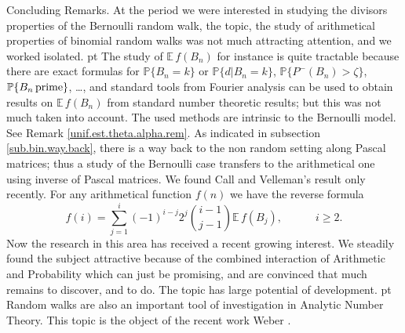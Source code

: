 \documentclass[11pt,draft,reqno]{amsart}
\makeatletter
\def\section{\@startsection{section}{1}%
     \z@{.7\linespacing\@plus\linespacing}{.5\linespacing}%
     {\bfseries%
     \centering
     }}
\theoremstyle{definition}
\theoremstyle{remarks}
\numberwithin{equation}{section}
\def \qq{{\qquad}}
\def\P{{\mathcal P}}
\def\E{{\mathbb E \,}}
\def\P{{\mathbb P}}
\makeatother
\begin{document}
 
 
 
 
 
 
 
 
 
 
 
 
 
 
 
 
 
  
  
  \section{Concluding Remarks.}\label{s10}
At the period we were interested in studying the divisors properties of the Bernoulli random walk, the topic, the study of arithmetical properties of binomial random walks was not much attracting attention, and we  worked   isolated.
 pt
The study of $\E f(B_n)$ for instance is quite tractable because there are exact formulas for $\P\{B_n=k\}$ or $\P\{d|B_n=k\}$,  $\P\{P^-(B_n)>\zeta \}$, $\P\{  B_n \,{\rm prime} \}$, \ldots, and standard tools from 
Fourier analysis    can be used to obtain results on $\E f(B_n)$ from standard number theoretic results; but this was not much taken into account. The used methods are intrinsic to the Bernoulli model. See   Remark \ref{unif.est.theta.alpha.rem}. %
As  indicated in subsection \ref{sub.bin.way.back}, there is a way back to the non random setting along Pascal matrices; 
thus a study of the Bernoulli case transfers to the  arithmetical one using inverse of Pascal matrices.  We found Call and Velleman's result only recently.
 For    any arithmetical function $f(n)$
 we have the reverse formula
 $$ f(i)=\sum_{j=1}^i  (-1)^{i-j}2^j{{i-1}\choose{j-1}}\E f(B_j),\qq\quad i\ge 2.
$$ 
Now the research in this area has received a recent growing interest.
We steadily found the subject attractive because of the combined interaction 
 of Arithmetic and Probability  which can just be promising, and are convinced  that much remains to discover, and to do. The topic has large potential of development.
 pt
Random walks are also an important tool of investigation  in Analytic  Number Theory.  This topic is the object of the recent work Weber \cite{W15}.     
  \appendix
   
\end{document}
